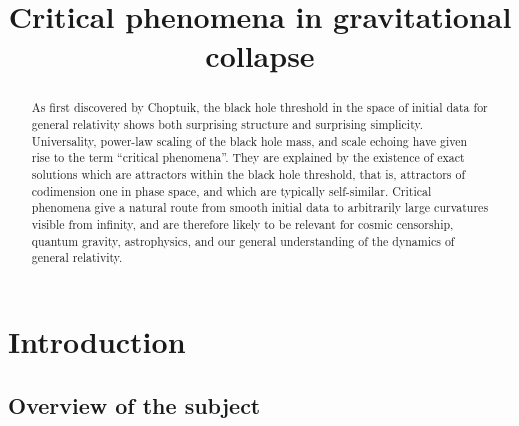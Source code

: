 \documentclass{article}
\begin{document}
\def\scri{$\mathscr{I}^+$}

\title{Critical phenomena in gravitational collapse}

\author{
\and
{}
}

\date{}
\maketitle

\begin{abstract}

As first discovered by Choptuik, the black hole threshold in the space
of initial data for general relativity shows both surprising structure
and surprising simplicity. Universality, power-law scaling of the
black hole mass, and scale echoing have given rise to the term
``critical phenomena''. They are explained by the existence of exact
solutions which are attractors within the black hole threshold, that
is, attractors of codimension one in phase space, and which are
typically self-similar. Critical phenomena give a natural route from
smooth initial data to arbitrarily large curvatures visible from
infinity, and are therefore likely to be relevant for cosmic
censorship, quantum gravity, astrophysics, and our general
understanding of the dynamics of general relativity.

\end{abstract}

\tableofcontents


\section{Introduction}


\subsection{Overview of the subject}
\end{document}
